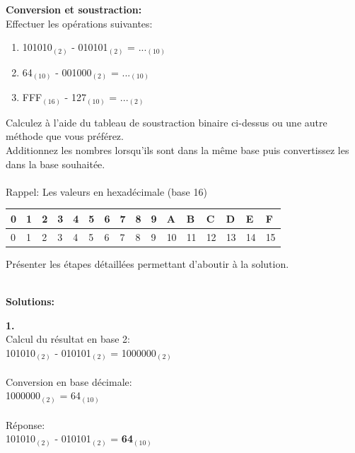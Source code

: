 \begin{Exercice}[20 minutes] \textbf{Conversion et soustraction:}\\
    Effectuer les opérations suivantes:
    \begin{enumerate}
        \item 101010$_{(2)}$ - 010101$_{(2)}$ = ...$_{(10)}$
        \item 64$_{(10)}$ - 001000$_{(2)}$ = ...$_{(10)}$
        \item FFF$_{(16)}$ - 127$_{(10)}$ = ...$_{(2)}$
    \end{enumerate}
    \begin{conseil}
            Calculez à l'aide du tableau de soustraction binaire ci-dessus ou une autre méthode que vous préférez.\\
            Additionnez les nombres lorsqu'ils sont dans la même base puis convertissez les dans la base souhaitée.\\\\
            Rappel: Les valeurs en hexadécimale (base 16)\\
            \begin{tabular}{| C{0.030\textwidth} | C{0.030\textwidth} | C{0.030\textwidth} | C{0.030\textwidth} | C{0.030\textwidth} | C{0.030\textwidth} | C{0.030\textwidth} | C{0.030\textwidth} | C{0.030\textwidth} | C{0.030\textwidth} | C{0.030\textwidth} | C{0.030\textwidth} | C{0.030\textwidth} | C{0.030\textwidth} | C{0.030\textwidth} | C{0.030\textwidth} |} 
            \hline
            \textbf{0} & \textbf{1} & \textbf{2} & \textbf{3} & \textbf{4} & \textbf{5} & \textbf{6} & \textbf{7} & \textbf{8} & \textbf{9} & \textbf{A} & \textbf{B} & \textbf{C} & \textbf{D} & \textbf{E} & \textbf{F}\\ [0.5ex]
             & 1 & 2 & 3 & 4 & 5 & 6 & 7 & 8 & 9 & 10 & 11 & 12 & 13 & 14 & 15 \\ [0.5ex] 
            \hline
        \end{tabular}
    \end{conseil}
    \begin{solution}
        Présenter les étapes détaillées permettant d'aboutir à la solution.
    \end{solution}

    \textbf{\\ \faTerminal  Solutions:}
    
    \textbf{1.}\\
    Calcul du résultat en base 2:\\
    101010$_{(2)}$ - 010101$_{(2)}$ = 1000000$_{(2)}$\\\\
    Conversion en base décimale:\\
    1000000$_{(2)}$ = 64$_{(10)}$\\\\
    Réponse:\\
    101010$_{(2)}$ - 010101$_{(2)}$ = \textbf{64$_{(10)}$}\\
    

\end{Exercice}
